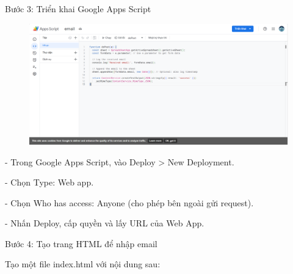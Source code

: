 Bước 3: Triển khai Google Apps Script

\begin{figure}[htbp]
    \centering
    \includegraphics[width=1\linewidth]{Chap1-7/AppScripts.pdf}
\end{figure}

- Trong Google Apps Script, vào Deploy > New Deployment.

- Chọn Type: Web app.

- Chọn Who has access: Anyone (cho phép bên ngoài gửi request).

- Nhấn Deploy, cấp quyền và lấy URL của Web App.

Bước 4: Tạo trang HTML để nhập email

Tạo một file index.html với nội dung sau:

